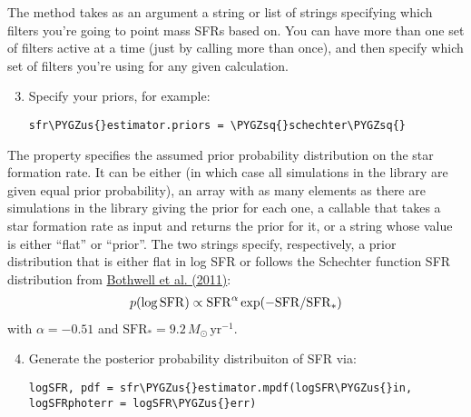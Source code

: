 \documentclass[letterpaper,10pt,english]{sphinxmanual}
\def\PYGZus{\char`\_}
\def\PYGZsq{\char`\'}
\renewcommand\PYGZsq{\textquotesingle}
\begin{document}
The  method takes as an argument a string or list of strings specifying which filters you're going to point mass SFRs based on. You can have more than one set of filters active at a time (just by calling  more than once), and then specify which set of filters you're using for any given calculation.
\begin{enumerate}
\setcounter{enumi}{2}
\item {} 
Specify your priors, for example:

\begin{Verbatim}[commandchars=\\\{\}]
sfr\PYGZus{}estimator.priors = \PYGZsq{}schechter\PYGZsq{}
\end{Verbatim}

\end{enumerate}

The  property specifies the assumed prior probability distribution on the star formation rate. It can be either  (in which case all simulations in the library are given equal prior probability), an array with as many elements as there are simulations in the library giving the prior for each one, a callable that takes a star formation rate as input and returns the prior for it, or a string whose value is either ``flat'' or ``prior''. The two strings specify, respectively, a prior distribution that is either flat in log SFR or follows the Schechter function SFR distribution from \href{http://adsabs.harvard.edu/abs/2011MNRAS.415.1815B}{Bothwell et al. (2011)}:
\begin{gather}
\begin{split}p(\log\mathrm{SFR}) \propto \mathrm{SFR}^{\alpha} \exp(-\mathrm{SFR}/\mathrm{SFR}_*)\end{split}\notag
\end{gather}
with \(\alpha = -0.51\) and \(\mathrm{SFR}_* = 9.2\,M_\odot\,\mathrm{yr}^{-1}\).
\begin{enumerate}
\setcounter{enumi}{3}
\item {} 
Generate the posterior probability distribuiton of SFR via:

\begin{Verbatim}[commandchars=\\\{\}]
logSFR, pdf = sfr\PYGZus{}estimator.mpdf(logSFR\PYGZus{}in, logSFRphoterr = logSFR\PYGZus{}err)
\end{Verbatim}

\end{enumerate}
\end{document}
